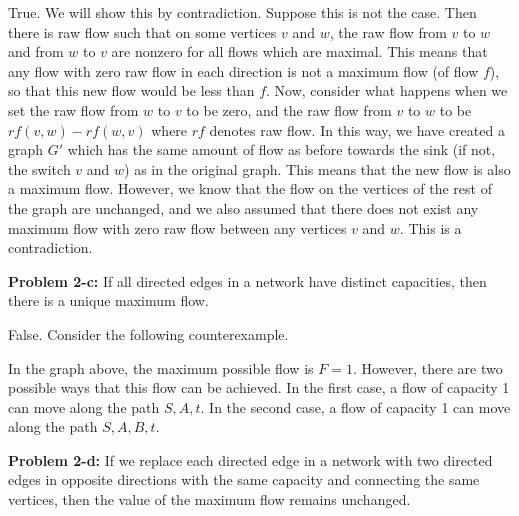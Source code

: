\documentclass[psamsfonts]{amsart}
\newenvironment{sol}{\vspace{0.25cm}{\large \bfseries Solution:}}{\qedsymbol}
\newenvironment{prob}[1]{\begin{framed}{\large \bfseries Problem #1:}}{\end{framed}}
\begin{document}
\begin{sol}
True. We will show this by contradiction. Suppose this is not the case. Then there is raw flow such that on some vertices $v$ and $w$, the raw flow from $v$ to $w$ and from $w$ to $v$ are nonzero for all flows which are maximal. This means that any flow with zero raw flow in each direction is not a maximum flow (of flow $f$), so that this new flow would be less than $f$. Now, consider what happens when we set the raw flow from $w$ to $v$ to be zero, and the raw flow from $v$ to $w$ to be $rf(v,w) - rf(w,v)$ where $rf$ denotes raw flow. In this way, we have created a graph $G'$ which has the same amount of flow as before towards the sink (if not, the switch $v$ and $w$) as in the original graph. This means that the new flow is also a maximum flow. However, we know that the flow on the vertices of the rest of the graph are unchanged, and we also assumed that there does not exist any maximum flow with zero raw flow between any vertices $v$ and $w$. This is a contradiction.
\end{sol}

\begin{prob}{2-c}
If all directed edges in a network have distinct capacities, then there is a unique maximum flow.
\end{prob}

\begin{sol}
False. Consider the following counterexample.
\begin{figure}[h!]
\centering
{}
\end{figure}

In the graph above, the maximum possible flow is $F = 1$. However, there are two possible ways that this flow can be achieved. In the first case, a flow of capacity 1 can move along the path $S, A, t$. In the second case, a flow of capacity 1 can move along the path $S, A, B, t$.
\end{sol}

\begin{prob}{2-d}
If we replace each directed edge in a network with two directed edges in opposite directions with the same capacity and connecting the same vertices, then the value of the maximum flow remains unchanged.
\end{prob}
\end{document}
